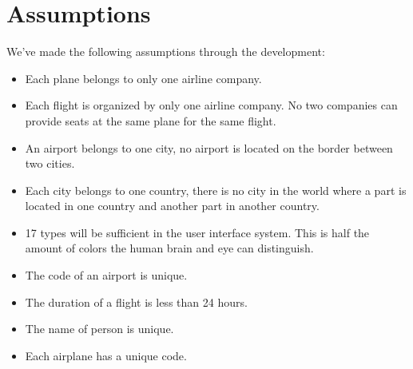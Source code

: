 
\section{Assumptions}
We've made the following assumptions through the development:
\begin{itemize}
 \item Each plane belongs to only one airline company.
 \item Each flight is organized by only one airline company. No two companies
can provide seats at the same plane for the same flight.
 \item An airport belongs to one city, no airport is located on the border
between two cities.
 \item Each city belongs to one country, there is no city in the world where a
part is located in one country and another part in another country.
 \item 17 types will be sufficient in the user interface system. This is half
the amount of colors the human brain and eye can distinguish.
\item The code of an airport is unique.
\item The duration of a flight is less than 24 hours.
\item The name of person is unique.
\item Each airplane has a unique code.
\end{itemize}